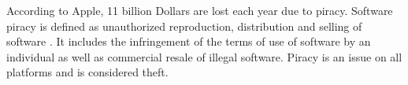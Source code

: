 According to Apple, 11 billion Dollars are lost each year due to piracy.
Software piracy is defined as unauthorized reproduction, distribution and selling of software \cite{applePiracy}.
It includes the infringement of the terms of use of software by an individual as well as commercial resale of illegal software.
Piracy is an issue on all platforms and is considered theft.
